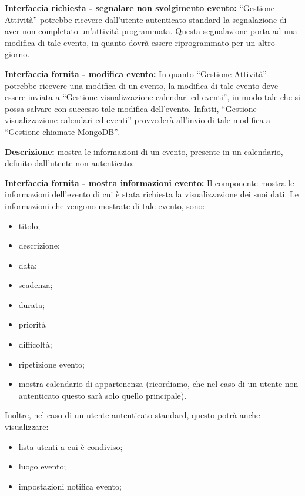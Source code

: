 \begin{listaPersonale}[DCI]{}
    \textbf{Interfaccia richiesta - segnalare non svolgimento evento:} “Gestione Attività” potrebbe ricevere dall'utente autenticato standard la segnalazione di aver non completato un'attività programmata.  Questa segnalazione porta ad una modifica di tale evento, in quanto dovrà essere riprogrammato per un altro giorno.

    \textbf{Interfaccia fornita - modifica evento:} In quanto “Gestione Attività” potrebbe ricevere una modifica di un evento, la modifica di tale evento deve essere inviata a “Gestione visualizzazione calendari ed eventi”, in modo tale che si possa salvare con successo tale modifica dell'evento. Infatti, “Gestione visualizzazione calendari ed eventi” provvederà all'invio di tale modifica a “Gestione chiamate MongoDB”.



    \textbf{Descrizione:} mostra le informazioni di un evento, presente in un calendario, definito dall'utente non autenticato.

    \textbf{Interfaccia fornita - mostra informazioni evento:} Il componente mostra le informazioni dell'evento di cui è stata richiesta la visualizzazione dei suoi dati. Le informazioni che vengono mostrate di tale evento, sono:
    \begin{itemize}
        \item titolo;
        \item descrizione;
        \item data;
        \item scadenza;
        \item durata;
        \item priorità
        \item difficoltà;
        \item ripetizione evento;
        \item mostra calendario di appartenenza (ricordiamo, che nel caso di un utente non autenticato questo sarà solo quello principale).
    \end{itemize}
    Inoltre, nel caso di un utente autenticato standard, questo potrà anche visualizzare:
    \begin{itemize}
        \item lista utenti a cui è condiviso;
        \item luogo evento;
        \item impostazioni notifica evento;
    \end{itemize}



\end{listaPersonale}
